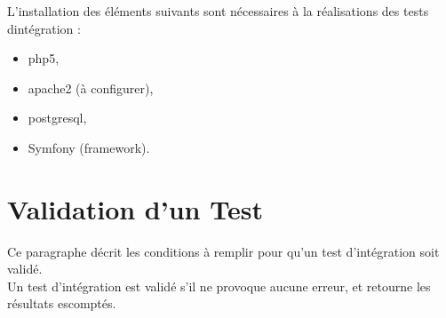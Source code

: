 	  L'installation des éléments suivants sont nécessaires à la réalisations des tests dintégration : 
	  \begin{itemize}
	  	\item php5,
	  	\item apache2 (à configurer),
	  	\item postgresql,
	  	\item Symfony (framework).
	  \end{itemize}
  
  \section{Validation d'un Test}
	Ce paragraphe décrit les conditions à remplir pour qu'un test d'intégration soit validé.\\
  
  	Un test d'intégration est validé s'il ne provoque aucune erreur, et retourne les résultats escomptés. 
  	
  	